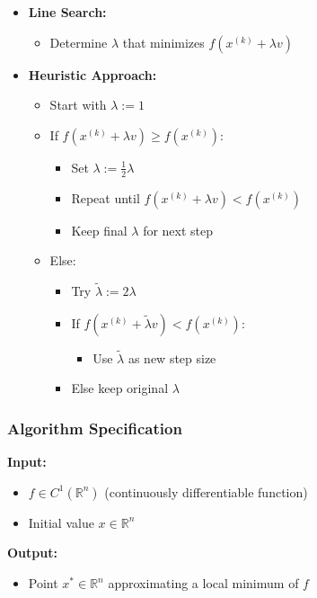 \documentclass{article}
\begin{document}
    \begin{itemize}
    \item \textbf{Line Search:}
    \begin{itemize}
    \item Determine $\lambda$ that minimizes $f(x^{(k)} + \lambda v)$
    \end{itemize}
    
    \item \textbf{Heuristic Approach:}
    \begin{itemize}
    \item Start with $\lambda := 1$
    \item If $f(x^{(k)} + \lambda v) \geq f(x^{(k)})$:
    \begin{itemize}
    \item Set $\lambda := \frac{1}{2}\lambda$
    \item Repeat until $f(x^{(k)} + \lambda v) < f(x^{(k)})$
    \item Keep final $\lambda$ for next step
    \end{itemize}
    \item Else:
    \begin{itemize}
    \item Try $\tilde{\lambda} := 2\lambda$
    \item If $f(x^{(k)} + \tilde{\lambda}v) < f(x^{(k)})$:
    \begin{itemize}
    \item Use $\tilde{\lambda}$ as new step size
    \end{itemize}
    \item Else keep original $\lambda$
    \end{itemize}
    \end{itemize}
    \end{itemize}
    
    \subsubsection*{Algorithm Specification}
    
    \textbf{Input:}
    \begin{itemize}
    \item $f \in C^1(\mathbb{R}^n)$ (continuously differentiable function)
    \item Initial value $x \in \mathbb{R}^n$
    \end{itemize}
    
    \textbf{Output:}
    \begin{itemize}
    \item Point $x^* \in \mathbb{R}^n$ approximating a local minimum of $f$
    \end{itemize}
\end{document}
